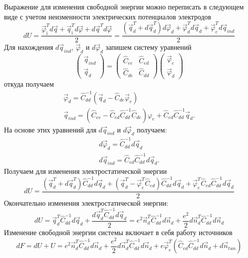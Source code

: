 \documentclass[12pt,a4paper]{scrartcl}
\begin{document}
Выражение для изменения свободной энергии можно переписать в следующем 
виде с учетом неизменности электрических потенциалов электродов
\begin{equation}
  dU = \frac{\vec{\varphi}^T_{\mbox{i}}d\vec{q}+
  \vec{q}^T_{\mbox{i}}d\vec{\varphi}+
  d\vec{q}^Td\vec{\varphi}}{2}=
  \frac{(\vec{q}^T_d+d\vec{q}^T_d)d\vec{\varphi}_d+
  \vec{\varphi}_d^Td\vec{q}_d+
  \vec{\varphi}_e^Td\vec{q}_{ind}}{2}
\end{equation}
Для нахождения $d\vec q_{ind}$, $\vec{\varphi}_d$ и 
$d\vec{\varphi}_d$ запишем систему уравнений
\begin{equation}
  \left(
  \begin{array}{c}
   \vec q_{ind}\\
   \vec q_d
  \end{array}
  \right)=
  \left(
  \begin{array}{cc}
   \hat C_{ee} & \hat C_{ed}\\
   \hat C_{de} & \hat C_{dd}
  \end{array}
  \right)
  \left(
  \begin{array}{c}
   \vec \varphi_e\\
   \vec \varphi_d
  \end{array}
  \right)
\end{equation}
откуда получаем
\begin{equation}
  \begin{array}{l}
   \vec \varphi_d=\hat C^{-1}_{dd}
   (\vec{q}_d-\hat C_{de}\vec \varphi_e)\\
   \vec q_{ind}=(\hat C_{ee}-\hat C_{ed}\hat C^{-1}_{dd}\hat C_{de})\varphi_e+
   \hat C_{ed}\hat C^{-1}_{dd}\vec q_d.
  \end{array}
\end{equation}
На основе этих уравнений для $d\vec q_{ind}$ и 
$d\vec{\varphi}_d$ получаем:
\begin{equation}
  \begin{array}{l}
   d\vec \varphi_d=\hat C^{-1}_{dd}d\vec{q}_d\\
   d\vec q_{ind}=
   \hat C_{ed}\hat C^{-1}_{dd}d\vec q_d.
  \end{array}
\end{equation}
Получаем для изменения электростатической энергии
\begin{equation}
  dU = 
  \frac{(\vec{q}^T_d+d\vec{q}^T_d)\hat C^{-1}_{dd}d\vec{q}_d+
  (\vec{q}_d^T-\vec \varphi_e^T\hat C_{ed})\hat C^{-1}_{dd}d\vec{q}_d+
  \vec{\varphi}_e^T\hat C_{ed}\hat C^{-1}_{dd}d\vec q_d}{2}
\end{equation}
Окончательно изменения электростатической энергии:
\begin{equation}
  dU = \vec{q}^T_d\hat C^{-1}_{dd}d\vec{q}_d+
  \frac{d\vec{q}^T_d\hat C^{-1}_{dd}d\vec{q}_d}{2}=
  e^2\vec{n}^T_d\hat C^{-1}_{dd}d\vec{n}_d+
  \frac{e^2}{2}d\vec{n}^T_d\hat C^{-1}_{dd}d\vec{n}_d
\end{equation}
Изменение свободной энергии системы включает в себя работу источников
\begin{equation}
 dF=dU + U=e^2\vec{n}^T_d\hat C^{-1}_{dd}d\vec{n}_d+
  \frac{e^2}{2}d\vec{n}^T_d\hat C^{-1}_{dd}d\vec{n}_d+
  e\vec \varphi_e^T(\hat C_{ed}\hat C^{-1}_{dd}d\vec{n}_d+d\vec{n}_{tun})
\end{equation}
\end{document}

